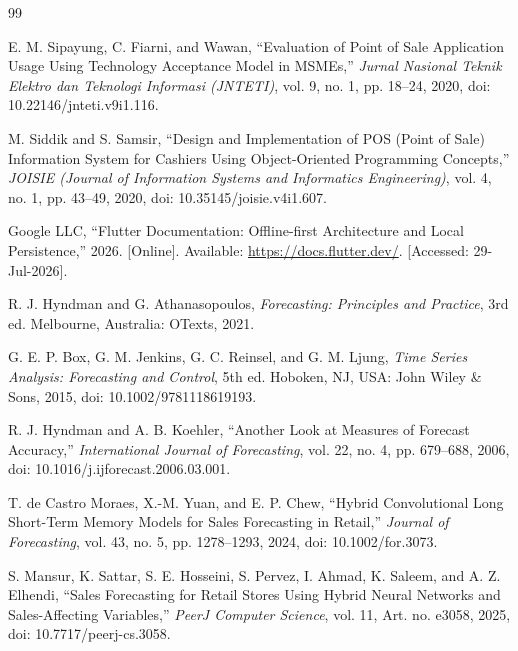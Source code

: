 \documentclass[10pt,a4paper]{article}
\begin{document}
\begingroup
\renewcommand{\section}[2]{}%
\begin{thebibliography}{99}
\fontsize{8pt}{10pt}\selectfont
\setlength{\itemsep}{1.5pt}
\setlength{\parskip}{0pt}

E. M. Sipayung, C. Fiarni, and Wawan, ``Evaluation of Point of Sale Application Usage Using Technology Acceptance Model in MSMEs,'' \textit{Jurnal Nasional Teknik Elektro dan Teknologi Informasi (JNTETI)}, vol. 9, no. 1, pp. 18--24, 2020, doi: 10.22146/jnteti.v9i1.116.

M. Siddik and S. Samsir, ``Design and Implementation of POS (Point of Sale) Information System for Cashiers Using Object-Oriented Programming Concepts,'' \textit{JOISIE (Journal of Information Systems and Informatics Engineering)}, vol. 4, no. 1, pp. 43--49, 2020, doi: 10.35145/joisie.v4i1.607.

Google LLC, ``Flutter Documentation: Offline-first Architecture and Local Persistence,'' 2026. [Online]. Available: \url{https://docs.flutter.dev/}. [Accessed: 29-Jul-2026].

R. J. Hyndman and G. Athanasopoulos, \textit{Forecasting: Principles and Practice}, 3rd ed. Melbourne, Australia: OTexts, 2021.

G. E. P. Box, G. M. Jenkins, G. C. Reinsel, and G. M. Ljung, \textit{Time Series Analysis: Forecasting and Control}, 5th ed. Hoboken, NJ, USA: John Wiley \& Sons, 2015, doi: 10.1002/9781118619193.

R. J. Hyndman and A. B. Koehler, ``Another Look at Measures of Forecast Accuracy,'' \textit{International Journal of Forecasting}, vol. 22, no. 4, pp. 679--688, 2006, doi: 10.1016/j.ijforecast.2006.03.001.

T. de Castro Moraes, X.-M. Yuan, and E. P. Chew, ``Hybrid Convolutional Long Short-Term Memory Models for Sales Forecasting in Retail,'' \textit{Journal of Forecasting}, vol. 43, no. 5, pp. 1278--1293, 2024, doi: 10.1002/for.3073.

S. Mansur, K. Sattar, S. E. Hosseini, S. Pervez, I. Ahmad, K. Saleem, and A. Z. Elhendi, ``Sales Forecasting for Retail Stores Using Hybrid Neural Networks and Sales-Affecting Variables,'' \textit{PeerJ Computer Science}, vol. 11, Art. no. e3058, 2025, doi: 10.7717/peerj-cs.3058.


\end{thebibliography}
\end{document}
